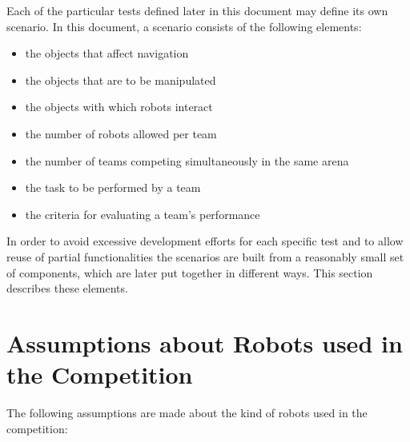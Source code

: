 
Each of the particular tests defined later in this document may define its own scenario. In this document, a scenario consists of the following elements:

\begin{itemize}
	\item the objects that affect navigation
	\item the objects that are to be manipulated
	\item the objects with which robots interact
	\item the number of robots allowed per team
	\item the number of teams competing simultaneously in the same arena
	\item the task to be performed by a team
	\item the criteria for evaluating a team's performance
\end{itemize}

In order to avoid excessive development efforts for each specific test and to allow reuse of partial functionalities the scenarios are built from a reasonably small set of components, which are later put together in different ways. This section describes these elements.

\section{Assumptions about Robots used in the Competition} \label{sec:AssumptionsAboutRobots}

The following assumptions are made about the kind of robots used in the competition:

